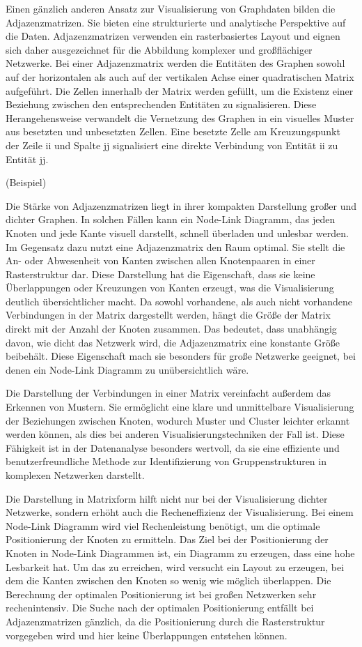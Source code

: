 Einen gänzlich anderen Ansatz zur Visualisierung von Graphdaten bilden die Adjazenzmatrizen. Sie bieten eine strukturierte und analytische Perspektive auf die Daten. Adjazenzmatrizen verwenden ein rasterbasiertes Layout und eignen sich daher ausgezeichnet für die Abbildung komplexer und großflächiger Netzwerke. Bei einer Adjazenzmatrix werden die Entitäten des Graphen sowohl auf der horizontalen als auch auf der vertikalen Achse einer quadratischen Matrix aufgeführt. Die Zellen innerhalb der Matrix werden gefüllt, um die Existenz einer Beziehung zwischen den entsprechenden Entitäten zu signalisieren. Diese Herangehensweise verwandelt die Vernetzung des Graphen in ein visuelles Muster aus besetzten und unbesetzten Zellen. Eine besetzte Zelle am Kreuzungspunkt der Zeile ii und Spalte jj signalisiert eine direkte Verbindung von Entität ii zu Entität jj.

(Beispiel)

Die Stärke von Adjazenzmatrizen liegt in ihrer kompakten Darstellung großer und dichter Graphen. In solchen Fällen kann ein Node-Link Diagramm, das jeden Knoten und jede Kante visuell darstellt, schnell überladen und unlesbar werden. Im Gegensatz dazu nutzt eine Adjazenzmatrix den Raum optimal. Sie stellt die An- oder Abwesenheit von Kanten zwischen allen Knotenpaaren in einer Rasterstruktur dar. Diese Darstellung hat die Eigenschaft, dass sie keine Überlappungen oder Kreuzungen von Kanten erzeugt, was die Visualisierung deutlich übersichtlicher macht. Da sowohl vorhandene, als auch nicht vorhandene Verbindungen in der Matrix dargestellt werden, hängt die Größe der Matrix direkt mit der Anzahl der Knoten zusammen. Das bedeutet, dass unabhängig davon, wie dicht das Netzwerk wird, die Adjazenzmatrix eine konstante Größe beibehält. Diese Eigenschaft mach sie besonders für große Netzwerke geeignet, bei denen ein Node-Link Diagramm zu unübersichtlich wäre. 

Die Darstellung der Verbindungen in einer Matrix vereinfacht außerdem das Erkennen von Mustern. Sie ermöglicht eine klare und unmittelbare Visualisierung der Beziehungen zwischen Knoten, wodurch Muster und Cluster leichter erkannt werden können, als dies bei anderen Visualisierungstechniken der Fall ist. Diese Fähigkeit ist in der Datenanalyse besonders wertvoll, da sie eine effiziente und benutzerfreundliche Methode zur Identifizierung von Gruppenstrukturen in komplexen Netzwerken darstellt.

Die Darstellung in Matrixform hilft nicht nur bei der Visualisierung dichter Netzwerke, sondern erhöht auch die Recheneffizienz der Visualisierung. Bei einem Node-Link Diagramm wird viel Rechenleistung benötigt, um die optimale Positionierung der Knoten zu ermitteln. Das Ziel bei der Positionierung der Knoten in Node-Link Diagrammen ist, ein Diagramm zu erzeugen, dass eine hohe Lesbarkeit hat. Um das zu erreichen, wird versucht ein Layout zu erzeugen, bei dem die Kanten zwischen den Knoten so wenig wie möglich überlappen. Die Berechnung der optimalen Positionierung ist bei großen Netzwerken sehr rechenintensiv. Die Suche nach der optimalen Positionierung entfällt bei Adjazenzmatrizen gänzlich, da die Positionierung durch die Rasterstruktur vorgegeben wird und hier keine Überlappungen entstehen können.

